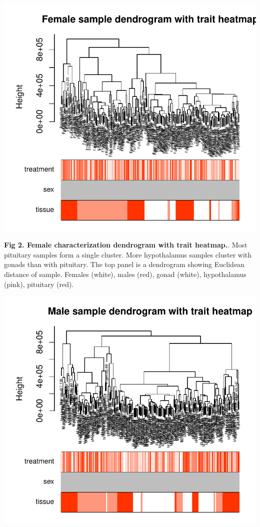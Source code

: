\documentclass[10pt,letterpaper]{article}
\begin{document}
\includegraphics{manuscript_draft_files/figure-latex/wgcna-female-1.pdf}

\textbf{Fig 2. Female characterization dendrogram with trait heatmap.}.
Most pituitary samples form a single cluster. More hypothalamus samples
cluster with gonads than with pituitary. The top panel is a dendrogram
showing Euclidean distance of sample. Females (white), males (red),
gonad (white), hypothalamus (pink), pituitary (red).

\includegraphics{manuscript_draft_files/figure-latex/wgcna-male-1.pdf}
\end{document}
